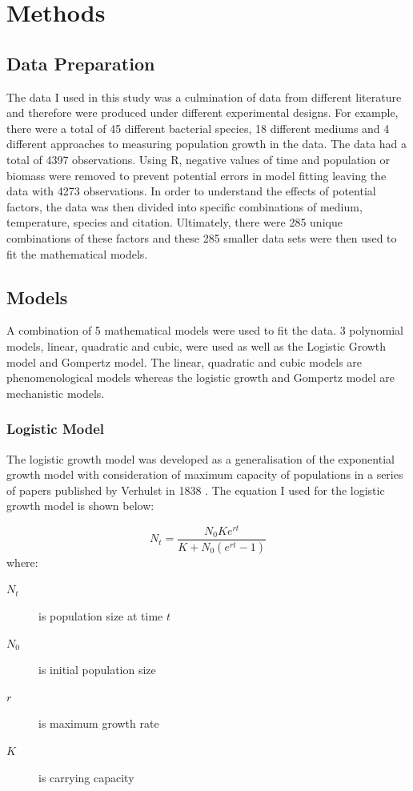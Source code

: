 \documentclass[11pt]{article}
\begin{document}
    \section{Methods}
    \subsection{Data Preparation}
    The data I used in this study was a culmination of data from  different literature and therefore were produced under different experimental designs. For example, there were a total of 45 different bacterial species, 18 different mediums and 4 different approaches to measuring population growth in the data.  The data had a total of 4397 observations. Using R, negative values of time and population or biomass were removed to prevent potential errors in model fitting leaving the data with 4273 observations. In order to understand the effects of potential factors, the data was then divided into specific combinations of medium, temperature, species and citation. Ultimately, there were 285 unique combinations of these factors and these 285 smaller data sets were then used to fit the mathematical models.
    
    \subsection{Models}
    A combination of 5 mathematical models were used to fit the data. 3 polynomial models, linear, quadratic and cubic, were used as well as the Logistic Growth model and Gompertz model. The linear, quadratic and cubic models are phenomenological models whereas the logistic growth and Gompertz model are mechanistic models. 
    
    \subsubsection{Logistic Model}
    The logistic growth model was developed as a generalisation of the exponential growth model with consideration of maximum capacity of populations in a series of papers published by Verhulst in 1838 \citep{bacaer2011verhulst}. The equation I used for the logistic growth model is shown below:
    
    \[N_t = \frac{N_0Ke^{rt}}{K + N_0(e^{rt}-1)}\]
    where:
    \begin{description}
    \item[$N_{t}$] is population size at time $t$
    \item[$N_{0}$] is initial population size
    \item[$r$] is maximum growth rate
    \item[$K$] is carrying capacity
    \end{description}
    
\end{document}
